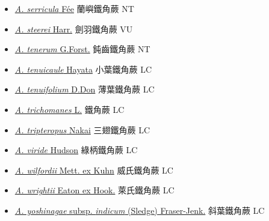 \begin{itemize}
\begin{itemize}
        \item[] \href{http://www.theplantlist.org/tpl1.1/search?q=Asplenium+serricula}{\textit{A. serricula} Fée}   蘭嶼鐵角蕨 NT
        \item[] \href{http://www.theplantlist.org/tpl1.1/search?q=Asplenium+steerei}{\textit{A. steerei} Harr.}   劍羽鐵角蕨 VU
        \item[] \href{http://www.theplantlist.org/tpl1.1/search?q=Asplenium+tenerum}{\textit{A. tenerum} G.Forst.}   鈍齒鐵角蕨 NT
        \item[] \href{http://www.theplantlist.org/tpl1.1/search?q=Asplenium+tenuicaule}{\textit{A. tenuicaule} Hayata}   小葉鐵角蕨 LC
        \item[] \href{http://www.theplantlist.org/tpl1.1/search?q=Asplenium+tenuifolium}{\textit{A. tenuifolium} D.Don}   薄葉鐵角蕨 LC
        \item[] \href{http://www.theplantlist.org/tpl1.1/search?q=Asplenium+trichomanes}{\textit{A. trichomanes} L.}   鐵角蕨 LC
        \item[] \href{http://www.theplantlist.org/tpl1.1/search?q=Asplenium+tripteropus}{\textit{A. tripteropus} Nakai}   三翅鐵角蕨 LC
        \item[] \href{http://www.theplantlist.org/tpl1.1/search?q=Asplenium+viride}{\textit{A. viride} Hudson}   綠柄鐵角蕨 LC
        \item[] \href{http://www.theplantlist.org/tpl1.1/search?q=Asplenium+wilfordii}{\textit{A. wilfordii} Mett. ex Kuhn}   威氏鐵角蕨 LC
        \item[] \href{http://www.theplantlist.org/tpl1.1/search?q=Asplenium+wrightii}{\textit{A. wrightii} Eaton ex Hook.}   萊氏鐵角蕨 LC
        \item[] \href{http://www.theplantlist.org/tpl1.1/search?q=Asplenium+yoshinagae+subsp.+indicum}{\textit{A. yoshinagae}  subsp. \textit{indicum} (Sledge) Fraser-Jenk.}     斜葉鐵角蕨 LC

\end{itemize}
\end{itemize}
